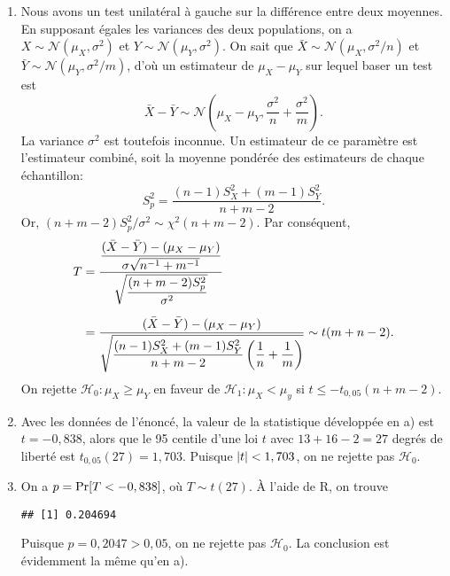 \begin{solution}{6.7}
    \begin{enumerate}
    \item Nous avons un test unilatéral à gauche sur la différence entre deux moyennes. En supposant égales les variances des deux populations, on a $X \sim \mathcal{N}(\mu_X, \sigma^2)$ et $Y \sim  \mathcal{N}(\mu_Y, \sigma^2)$. On sait que $\bar{X} \sim \mathcal{N}(\mu_X, \sigma^2/n)$ et $\bar{Y} \sim \mathcal{N}(\mu_Y, \sigma^2/m)$, d'où un estimateur de $\mu_X - \mu_Y$ sur lequel baser un test est
      \begin{equation*}
        \bar{X} - \bar{Y} \sim
        \mathcal{N}\left(
          \mu_X - \mu_Y, \frac{\sigma^2}{n} + \frac{\sigma^2}{m} \right).
      \end{equation*}
      La variance $\sigma^2$ est toutefois inconnue. Un estimateur de ce paramètre est l'estimateur combiné, soit la moyenne pondérée des estimateurs de chaque échantillon:
      \begin{equation*}
      S_p^2 = \frac{(n - 1) S_X^2 + (m - 1) S_Y^2}{n + m - 2}.
      \end{equation*}
      Or, $(n + m - 2) S_p^2/\sigma^2 \sim \chi^2(n + m - 2)$. Par conséquent,
   \begin{align*}
          T &= \frac{\D \frac{(\bar{X} - \bar{Y}) - (\mu_X-\mu_Y)}{%
            \sigma \sqrt{n^{-1} + m^{-1}}}}{%
          \D \sqrt{\frac{(n + m - 2) S_p^2}{\sigma^2}}} \\[6pt]
        &= \frac{(\bar{X} - \bar{Y}) - (\mu_X-\mu_Y)}{%
          \D\sqrt{\frac{(n-1) S_X^2 + (m-1) S_Y^2}{n + m - 2}
            \left(
              \frac{1}{n} + \frac{1}{m}
            \right)}} \sim t(m + n - 2).
      \end{align*}
On rejette $ \mathcal{H}_0: \mu_X \ge \mu_Y$ en faveur de $ \mathcal{H}_1: \mu_X < \mu_y$ si $t \leq -t_{0,05}(n + m - 2)$.
  \item Avec les données de l'énoncé, la valeur de la statistique développée en a) est $t = -0,838$, alors que le 95{\ieme} centile d'une loi $t$ avec $13 + 16 - 2 = 27$ degrés de liberté est $t_{0,05}(27) = 1,703$. Puisque $\lvert t \rvert < 1,703$, on ne rejette pas $ \mathcal{H}_0$.

\item On a $p = \mathrm{Pr} [ T < -0,838 ]$, où $T \sim t(27)$. À l'aide de \textsf{R}, on trouve
\begin{knitrout}
\color{fgcolor}\begin{kframe}
\begin{alltt}
\hlstd{(}\hlopt{-}\hlstd{,}  \hlstd{=} \hlstd{)}
\end{alltt}
\begin{verbatim}
## [1] 0.204694
\end{verbatim}
\end{kframe}
\end{knitrout}
      Puisque
      $p = 0,2047 > 0,05$, on ne rejette pas $ \mathcal{H}_0$. La conclusion est évidemment la même qu'en a).


\end{enumerate}
\end{solution}
